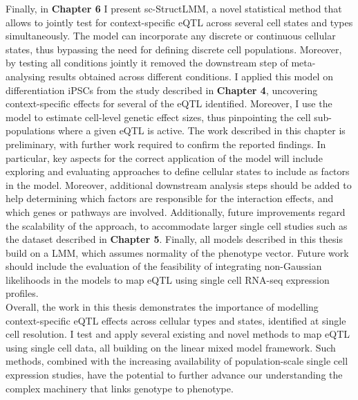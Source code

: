 Finally, in \textbf{Chapter 6} I present sc-StructLMM, a novel statistical method that allows to jointly test for context-specific eQTL across several cell states and types simultaneously.
The model can incorporate any discrete or continuous cellular states, thus bypassing the need for defining discrete cell populations.
Moreover, by testing all conditions jointly it removed the downstream step of meta-analysing results obtained across different conditions. 
I applied this model on differentiation iPSCs from the study described in \textbf{Chapter 4}, uncovering context-specific effects for several of the eQTL identified.
Moreover, I use the model to estimate cell-level genetic effect sizes, thus pinpointing the cell sub-populations where a given eQTL is active. 
The work described in this chapter is preliminary, with further work required to confirm the reported findings.
In particular, key aspects for the correct application of the model will include exploring and evaluating approaches to define cellular states to include as factors in the model.
Moreover, additional downstream analysis steps should be added to help determining which factors are responsible for the interaction effects, and which genes or pathways are involved.
Additionally, future improvements regard the scalability of the approach, to accommodate larger single cell studies such as the dataset described in \textbf{Chapter 5}.
Finally, all models described in this thesis build on a LMM, which assumes normality of the phenotype vector.
Future work should include the evaluation of the feasibility of integrating non-Gaussian likelihoods in the models to map eQTL using single cell RNA-seq expression profiles.\\

Overall, the work in this thesis demonstrates the importance of modelling context-specific eQTL effects across cellular types and states, identified at single cell resolution.
I test and apply several existing and novel methods to map eQTL using single cell data, all building on the linear mixed model framework. 
Such methods, combined with the increasing availability of population-scale single cell expression studies, have the potential to further advance our understanding the complex machinery that links genotype to phenotype.





